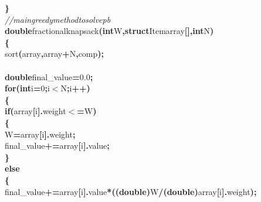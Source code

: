 \documentclass[a4paper, 10pt]{article}
\newcommand\SPC{\hspace*{0.6em}}
\newcommand\TAB{\hspace*{1.2em}}
\newcommand\HYP{\mbox{\char 45}}
\newcommand{\CppAComment}[1]{\textit{\textcolor[rgb]{0,0.47,0.84}{#1}}}
\newcommand{\CppAFloat}[1]{\textcolor[rgb]{0.5,0,0.5}{#1}}
\newcommand{\CppAIdentifier}[1]{#1}
\newcommand{\CppANumber}[1]{\textcolor[rgb]{0.5,0,0.5}{#1}}
\newcommand{\CppAReservedWord}[1]{\textbf{#1}}
\newcommand{\CppASpace}[1]{\colorbox[rgb]{1,1,1}{#1}}
\newcommand{\CppASymbol}[1]{\textbf{\textcolor[rgb]{1,0,0}{#1}}}
\begin{document}
\begin{ttfamily}
\CppASymbol{\}}\\
\CppAComment{//main\SPC greedy\SPC method\SPC to\SPC solve\SPC pb}\\
\CppAReservedWord{double}\CppASpace{\SPC }\CppAIdentifier{fractionalknapsack}\CppASymbol{(}\CppAReservedWord{int}\CppASpace{\SPC }\CppAIdentifier{W}\CppASymbol{,}\CppAReservedWord{struct}\CppASpace{\SPC }\CppAIdentifier{Item}\CppASpace{\SPC }\CppAIdentifier{array}\CppASymbol{[}\CppASymbol{]}\CppASymbol{,}\CppAReservedWord{int}\CppASpace{\SPC }\CppAIdentifier{N}\CppASymbol{)}\\
\CppASymbol{\{}\\
\CppASpace{\TAB }\CppAIdentifier{sort}\CppASymbol{(}\CppAIdentifier{array}\CppASymbol{,}\CppAIdentifier{array}\CppASymbol{+}\CppAIdentifier{N}\CppASymbol{,}\CppAIdentifier{comp}\CppASymbol{)}\CppASymbol{;}\\
\CppASpace{\TAB }\\
\CppASpace{\TAB }\CppAReservedWord{double}\CppASpace{\SPC }\CppAIdentifier{final\_value}\CppASymbol{=}\CppAFloat{0.0}\CppASymbol{;}\\
\CppASpace{\TAB }\CppAReservedWord{for}\CppASymbol{(}\CppAReservedWord{int}\CppASpace{\SPC }\CppAIdentifier{i}\CppASymbol{=}\CppANumber{0}\CppASymbol{;}\CppAIdentifier{i}\CppASymbol{$<$}\CppAIdentifier{N}\CppASymbol{;}\CppAIdentifier{i}\CppASymbol{++}\CppASymbol{)}\\
\CppASpace{\TAB }\CppASymbol{\{}\\
\CppASpace{\TAB \TAB }\CppAReservedWord{if}\CppASymbol{(}\CppAIdentifier{array}\CppASymbol{[}\CppAIdentifier{i}\CppASymbol{]}\CppASymbol{.}\CppAIdentifier{weight}\CppASymbol{$<$=}\CppAIdentifier{W}\CppASymbol{)}\\
\CppASpace{\TAB \TAB }\CppASymbol{\{}\\
\CppASpace{\TAB \TAB \TAB }\CppAIdentifier{W}\CppASymbol{\HYP =}\CppAIdentifier{array}\CppASymbol{[}\CppAIdentifier{i}\CppASymbol{]}\CppASymbol{.}\CppAIdentifier{weight}\CppASymbol{;}\\
\CppASpace{\TAB \TAB \TAB }\CppAIdentifier{final\_value}\CppASymbol{+=}\CppAIdentifier{array}\CppASymbol{[}\CppAIdentifier{i}\CppASymbol{]}\CppASymbol{.}\CppAIdentifier{value}\CppASymbol{;}\\
\CppASpace{\TAB \TAB }\CppASymbol{\}}\\
\CppASpace{\TAB \TAB }\CppAReservedWord{else}\\
\CppASpace{\TAB \TAB }\CppASymbol{\{}\\
\CppASpace{\TAB \TAB \TAB }\CppAIdentifier{final\_value}\CppASymbol{+=}\CppAIdentifier{array}\CppASymbol{[}\CppAIdentifier{i}\CppASymbol{]}\CppASymbol{.}\CppAIdentifier{value}\CppASymbol{*}\CppASymbol{(}\CppASymbol{(}\CppAReservedWord{double}\CppASymbol{)}\CppAIdentifier{W}\CppASymbol{/}\CppASymbol{(}\CppAReservedWord{double}\CppASymbol{)}\CppAIdentifier{array}\CppASymbol{[}\CppAIdentifier{i}\CppASymbol{]}\CppASymbol{.}\CppAIdentifier{weight}\CppASymbol{)}\CppASymbol{;}\\

\end{ttfamily}
\end{document}
